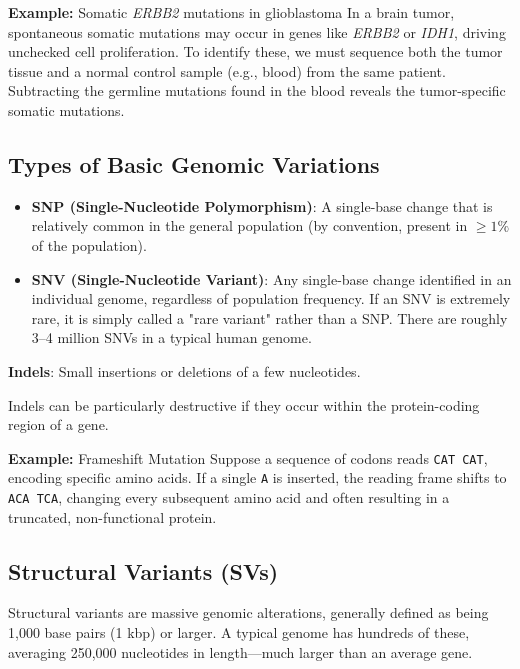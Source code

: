 \textbf{Example:} Somatic \textit{ERBB2} mutations in glioblastoma
In a brain tumor, spontaneous somatic mutations may occur in genes like \textit{ERBB2} or \textit{IDH1}, driving unchecked cell proliferation. To identify these, we must sequence both the tumor tissue and a normal control sample (e.g., blood) from the same patient. Subtracting the germline mutations found in the blood reveals the tumor-specific somatic mutations.

\subsection{Types of Basic Genomic Variations}

\begin{itemize}
  \item \textbf{SNP (Single-Nucleotide Polymorphism)}: A single-base change that is relatively common in the general population (by convention, present in $\ge 1\%$ of the population).
  \item \textbf{SNV (Single-Nucleotide Variant)}: Any single-base change identified in an individual genome, regardless of population frequency. If an SNV is extremely rare, it is simply called a "rare variant" rather than a SNP. There are roughly 3–4 million SNVs in a typical human genome.
\end{itemize}

\begin{important}
  \textbf{Indels}: Small insertions or deletions of a few nucleotides.
\end{important}

Indels can be particularly destructive if they occur within the protein-coding region of a gene. 

\textbf{Example:} Frameshift Mutation
Suppose a sequence of codons reads \texttt{CAT CAT}, encoding specific amino acids. If a single \texttt{A} is inserted, the reading frame shifts to \texttt{ACA TCA}, changing every subsequent amino acid and often resulting in a truncated, non-functional protein.

\subsection{Structural Variants (SVs)}

Structural variants are massive genomic alterations, generally defined as being 1,000 base pairs (1 kbp) or larger. A typical genome has hundreds of these, averaging 250,000 nucleotides in length—much larger than an average gene.

